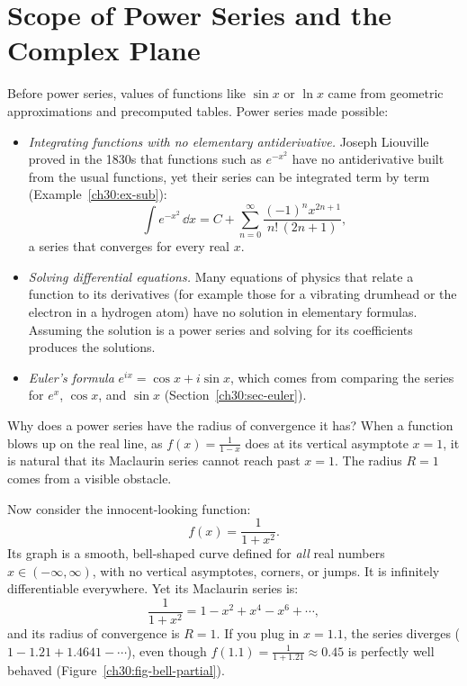 \section{Scope of Power Series and the Complex Plane}

\begin{connectionbox}
Before power series, values of functions like $\sin x$ or $\ln x$ came from geometric approximations and precomputed tables. Power series made possible:
\begin{itemize}
  \item \emph{Integrating functions with no elementary antiderivative.} Joseph Liouville proved in the 1830s that functions such as $e^{-x^2}$ have no antiderivative built from the usual functions, yet their series can be integrated term by term (Example~\ref{ch30:ex-sub}):
  \[
    \int e^{-x^2}\,\dd x = C + \sum_{n=0}^{\infty} \frac{(-1)^n x^{2n+1}}{n!\,(2n+1)},
  \]
  a series that converges for every real $x$.
  \item \emph{Solving differential equations.} Many equations of physics that relate a function to its derivatives (for example those for a vibrating drumhead or the electron in a hydrogen atom) have no solution in elementary formulas. Assuming the solution is a power series and solving for its coefficients produces the solutions.
  \item \emph{Euler's formula} $e^{ix} = \cos x + i\sin x$, which comes from comparing the series for $e^x$, $\cos x$, and $\sin x$ (Section~\ref{ch30:sec-euler}).
\end{itemize}
\end{connectionbox}

Why does a power series have the radius of convergence it has?
When a function blows up on the real line, as $f(x) = \frac{1}{1-x}$ does at its vertical asymptote $x = 1$, it is natural that its Maclaurin series cannot reach past $x = 1$. The radius $R = 1$ comes from a visible obstacle.

Now consider the innocent-looking function:
\[
  f(x) = \frac{1}{1+x^2}.
\]
Its graph is a smooth, bell-shaped curve defined for \emph{all} real numbers $x \in (-\infty, \infty)$, with no vertical asymptotes, corners, or jumps. It is infinitely differentiable everywhere. Yet its Maclaurin series is:
\[
  \frac{1}{1+x^2} = 1 - x^2 + x^4 - x^6 + \cdots,
\]
and its radius of convergence is $R = 1$.
If you plug in $x = 1.1$, the series diverges ($1 - 1.21 + 1.4641 - \cdots$), even though $f(1.1) = \frac{1}{1 + 1.21} \approx 0.45$ is perfectly well behaved (Figure~\ref{ch30:fig-bell-partial}).

